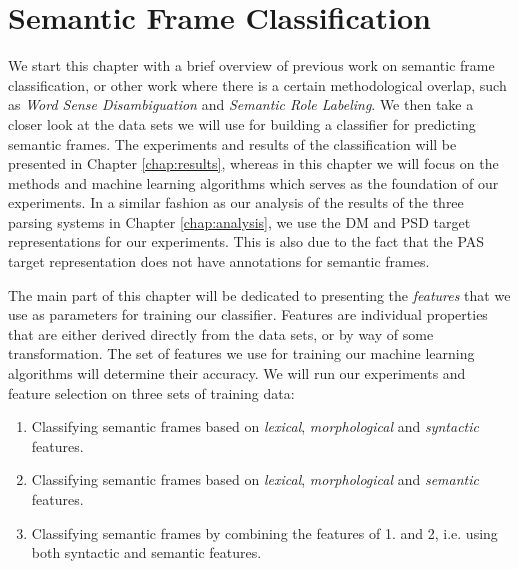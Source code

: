 \chapter{Semantic Frame Classification}
\label{chap:experiments}



We start this chapter with a brief overview of previous work on semantic frame classification, or other work where there is a certain methodological overlap, such as \textit{Word Sense Disambiguation} and \textit{Semantic Role Labeling}. We then take a closer look at the data sets we will use for building a classifier for predicting semantic frames. The experiments and results of the classification will be presented in Chapter \ref{chap:results}, whereas in this chapter we will focus on the methods and machine learning algorithms which serves as the foundation of our experiments. In a similar fashion as our analysis of the results of the three parsing systems in Chapter \ref{chap:analysis}, we use the DM and PSD target representations for our experiments. This is also due to the fact that the PAS target representation does not have annotations for semantic frames.

The main part of this chapter will be dedicated to presenting the \textit{features} that we use as parameters for training our classifier. Features are individual properties that are either derived directly from the data sets, or by way of some transformation. The set of features we use for training our machine learning algorithms will determine their accuracy. We will run our experiments and feature selection on three sets of training data:

\begin{enumerate}
    \item Classifying semantic frames based on \textit{lexical}, \textit{morphological} and \textit{syntactic} features.
    \item Classifying semantic frames based on \textit{lexical}, \textit{morphological} and \textit{semantic} features.
    \item Classifying semantic frames by combining the features of 1. and 2, i.e. using both syntactic and semantic features.
\end{enumerate}

